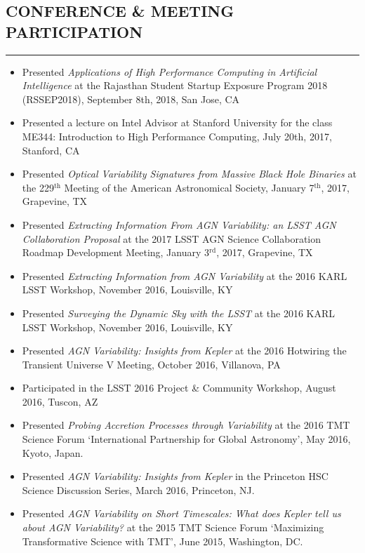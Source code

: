 \documentclass[10pt,a4]{article}
\begin{document}
\subsection*{CONFERENCE \& MEETING PARTICIPATION}
\hrule  height 4pt
\vspace{0.2cm}
\begin{itemize}
    \item Presented {\it Applications of High Performance Computing in Artificial Intelligence} at the Rajasthan Student Startup Exposure Program 2018 (RSSEP2018), September 8th, 2018, San Jose, CA
    \item Presented a lecture on Intel Advisor at Stanford University for the class ME344: Introduction to High Performance Computing, July 20th, 2017, Stanford, CA
    \item Presented {\it Optical Variability Signatures from Massive Black Hole Binaries} at the 229$^{\mathrm{th}}$ Meeting of the American Astronomical Society, January 7$^{\mathrm{th}}$, 2017, Grapevine, TX
    \item Presented {\it Extracting Information From AGN Variability: an LSST AGN Collaboration Proposal} at the 2017 LSST AGN Science Collaboration Roadmap Development Meeting, January 3$^{\mathrm{rd}}$, 2017, Grapevine, TX
    \item Presented {\it Extracting Information from AGN Variability} at the 2016 KARL LSST Workshop, November 2016, Louisville, KY
    \item Presented {\it Surveying the Dynamic Sky with the LSST} at the 2016 KARL LSST Workshop, November 2016, Louisville, KY
    \item Presented {\it AGN Variability: Insights from Kepler} at the 2016 Hotwiring the Transient Universe V Meeting, October 2016, Villanova, PA
    \item Participated in the LSST 2016 Project \& Community Workshop, August 2016, Tuscon, AZ
    \item Presented {\it Probing Accretion Processes through Variability} at the 2016 TMT Science Forum `International Partnership for Global Astronomy', May 2016, Kyoto, Japan.
    \item Presented {\it AGN Variability: Insights from Kepler} in the Princeton HSC Science Discussion Series, March 2016, Princeton, NJ.
    \item Presented {\it AGN Variability on Short Timescales: What does Kepler tell us about AGN Variability?} at the 2015 TMT Science Forum `Maximizing Transformative Science with TMT', June 2015, Washington, DC.

\end{itemize}
\end{document}
